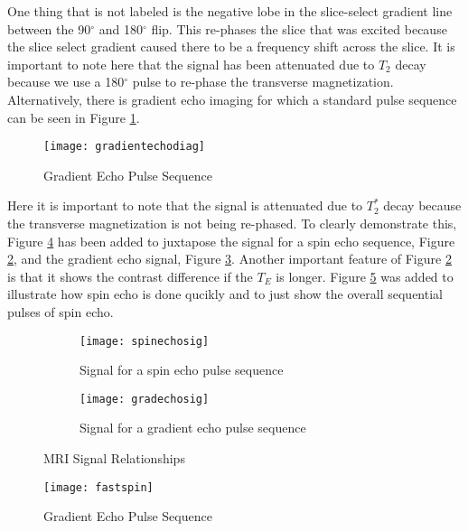 One thing that is not labeled is the negative lobe in the slice-select gradient line between the 90$^\circ$ and 180$^\circ$ flip. This re-phases the slice that was excited because the slice select gradient caused there to be a frequency shift across the slice. It is important to note here that the signal has been attenuated due to $T_2$ decay because we use a 180$^\circ$ pulse to re-phase the transverse magnetization.  Alternatively, there is gradient echo imaging for which a standard pulse sequence can be seen in Figure \ref{fig:mri:gradecho}. 


\begin{figure}[h]
	\centering
	\texttt{[image: gradientechodiag]}	
	\caption{Gradient Echo Pulse Sequence}
\label{fig:mri:gradecho}
\end{figure}

Here it is important to note that the signal is attenuated due to $T_2^*$ decay because the transverse magnetization is not being re-phased. To clearly demonstrate this, Figure \ref{fig:mri:sig} has been added to juxtapose the signal for a spin echo sequence, Figure \ref{fig:mri:spinsig}, and the gradient echo signal, Figure \ref{fig:mri:gradsig}. 
Another important feature of Figure \ref{fig:mri:spinsig} is that it shows the contrast difference if the $T_E$ is longer. Figure \ref{fig:mri:fastspin} was added to illustrate how spin echo is done qucikly and to just show the overall sequential pulses of spin echo.

\begin{figure}[h!]
	\centering
	\begin{subfigure}[b]{0.45\textwidth}
		\centering
		\texttt{[image: spinechosig]}
		\caption{Signal for a spin echo pulse sequence}
		\label{fig:mri:spinsig}
	\end{subfigure}\hfill
	\begin{subfigure}[b]{0.45\textwidth}
		\centering
		\texttt{[image: gradechosig]}
		\caption{Signal for a gradient echo pulse sequence}
		\label{fig:mri:gradsig}
	\end{subfigure}
	\caption{MRI Signal Relationships}\label{fig:mri:sig}
\end{figure} 

\begin{figure}[h!]
	\centering
	\texttt{[image: fastspin]}	
	\caption{Gradient Echo Pulse Sequence}
	\label{fig:mri:fastspin}
\end{figure}
